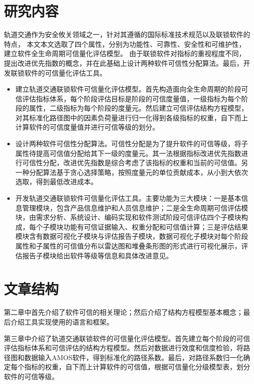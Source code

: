 \section{研究内容}
轨道交通作为安全攸关领域之一，针对其遵循的国际标准技术规范以及联锁软件的特点，
本文本文选取了四个属性，分别为功能性、可靠性、安全性和可维护性，建立软件全生命周期可信量化评估模型。
由于联锁软件对指标的重视程度不同，提出改进优先指数的概念\cite{2011改进的最大优先指标及在计算机化自适应诊断测验中的应用}，并在此基础上设计两种软件可信性分配算法。最后，开发联锁软件的可信量化评估工具。

\begin{itemize}
	\item 建立轨道交通联锁软件可信量化评估模型。首先构造面向全生命周期的阶段可信评估指标体系，每个阶段评估目标是阶段的可信度量值，一级指标为每个阶段的属性，二级指标为每个阶段的度量元。然后建立可信评估结构方程模型，对其标准化路径图中的因素负荷量进行归一化得到各级指标的权重，自下而上计算软件的可信度量值并进行可信等级的划分。
	
	\item 设计两种软件可信性分配算法。可信性分配是为了提升软件的可信等级，将子属性待提高可信值分配给其下一级的度量元。其一法根据指标改进优先指数进行可信性分配，改进优先指数是综合考虑了该指标的权重和当前的可信值。另一种分配算法基于贪心选择策略，按照度量元的单位贡献成本，从小到大依次选取，得到最低改进成本。
	
	\item 开发轨道交通联锁软件可信量化评估工具。主要功能为三大模块：一是基本信息管理模块，包含产品信息维护和人员信息维护；二是全生命周期可信评估模块，由需求分析、系统设计、编码实现和软件测试阶段可信评估四个子模块构成，每个子模块功能有可信证据输入、权重分配和可信值计算；三是评估结果模块含有数据可视化子模块与评估报告子模块，数据可视化子模块对每个阶段属性和子属性的可信值分布以雷达图和堆叠条形图的形式进行可视化展示，评估报告子模块给出软件等级等信息和具体改进意见。
	
\end{itemize}
\section{文章结构}
第二章中首先介绍了软件可信的相关理论；然后介绍了结构方程模型基本概念；最后介绍工具实现使用的语言和框架。

第三章中介绍了轨道交通联锁软件的可信量化评估模型。首先建立每个阶段的可信评估指标体系和可信评估的结构方程模型。然后对数据进行效度和信度检验，将路径图和数据输入AMOS软件，得到标准化的路径系数。最后，对路径系数归一化确定每个指标的权重，自下而上计算软件的可信值，根据可信量化分级模型表，划分软件的可信等级。

